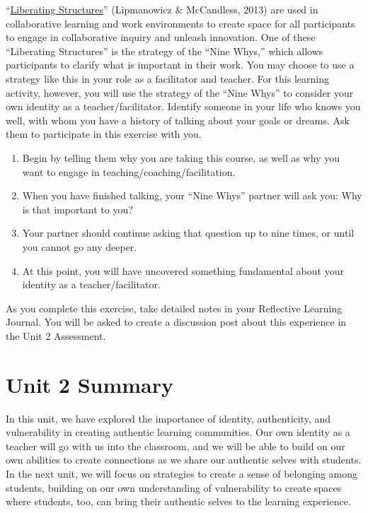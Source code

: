 \documentclass[
]{book}
\begin{document}
\begin{reflect}
``\href{https://www.liberatingstructures.com/ls-menu}{Liberating
Structures}'' (Lipmanowicz \& McCandless, 2013) are used in
collaborative learning and work environments to create space for all
participants to engage in collaborative inquiry and unleash innovation.
One of these ``Liberating Structures'' is the strategy of the ``Nine
Whys,'' which allows participants to clarify what is important in their
work. You may choose to use a strategy like this in your role as a
facilitator and teacher. For this learning activity, however, you will
use the strategy of the ``Nine Whys'' to consider your own identity as a
teacher/facilitator. Identify someone in your life who knows you well,
with whom you have a history of talking about your goals or dreams. Ask
them to participate in this exercise with you.

\begin{enumerate}
\def\labelenumi{\arabic{enumi}.}
\item
  Begin by telling them why you are taking this course, as well as why
  you want to engage in teaching/coaching/facilitation.
\item
  When you have finished talking, your ``Nine Whys'' partner will ask
  you: Why is that important to you?
\item
  Your partner should continue asking that question up to nine times, or
  until you cannot go any deeper.
\item
  At this point, you will have uncovered something fundamental about
  your identity as a teacher/facilitator.
\end{enumerate}

As you complete this exercise, take detailed notes in your Reflective
Learning Journal. You will be asked to create a discussion post about
this experience in the Unit 2 Assessment.
\end{reflect}

\hypertarget{unit-2-summary}{%
\section*{Unit 2 Summary}\label{unit-2-summary}}

In this unit, we have explored the importance of identity, authenticity, and vulnerability in creating authentic learning communities. Our own identity as a teacher will go with us into the classroom, and we will be able to build on our own abilities to create connections as we share our authentic selves with students. In the next unit, we will focus on strategies to create a sense of belonging among students, building on our own understanding of vulnerability to create spaces where students, too, can bring their authentic selves to the learning experience.
\end{document}
